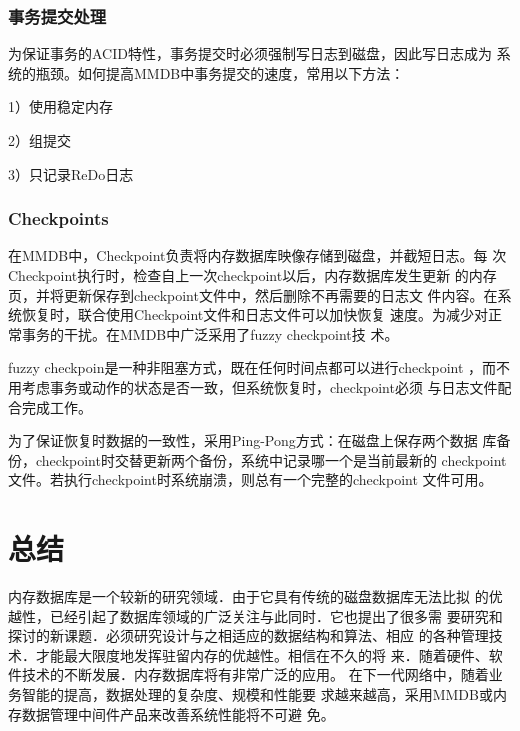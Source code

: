 \documentclass[literaturereview]{zjutreport}
\begin{document}
\subsection{事务提交处理}
为保证事务的ACID特性，事务提交时必须强制写日志到磁盘，因此写日志成为
系统的瓶颈。如何提高MMDB中事务提交的速度，常用以下方法：

1）使用稳定内存

2）组提交

3）只记录ReDo日志

\subsection{Checkpoints}
在MMDB中，Checkpoint负责将内存数据库映像存储到磁盘，并截短日志。每
次Checkpoint执行时，检查自上一次checkpoint以后，内存数据库发生更新
的内存页，并将更新保存到checkpoint文件中，然后删除不再需要的日志文
件内容。在系统恢复时，联合使用Checkpoint文件和日志文件可以加快恢复
速度。为减少对正常事务的干扰。在MMDB中广泛采用了fuzzy checkpoint技
术。

fuzzy checkpoin是一种非阻塞方式，既在任何时间点都可以进行checkpoint
，而不用考虑事务或动作的状态是否一致，但系统恢复时，checkpoint必须
与日志文件配合完成工作。

为了保证恢复时数据的一致性，采用Ping-Pong方式：在磁盘上保存两个数据
库备份，checkpoint时交替更新两个备份，系统中记录哪一个是当前最新的
checkpoint文件。若执行checkpoint时系统崩溃，则总有一个完整的checkpoint
文件可用。

\chapter{总结}
内存数据库是一个较新的研究领域．由于它具有传统的磁盘数据库无法比拟
的优越性，已经引起了数据库领域的广泛关注与此同时．它也提出了很多需
要研究和探讨的新课题．必须研究设计与之相适应的数据结构和算法、相应
的各种管理技术．才能最大限度地发挥驻留内存的优越性。相信在不久的将
来．随着硬件、软件技术的不断发展．内存数据库将有非常广泛的应用。
在下一代网络中，随着业务智能的提高，数据处理的复杂度、规模和性能要
求越来越高，采用MMDB或内存数据管理中间件产品来改善系统性能将不可避
免。

\backmatter
\endgroup %
\clearpage %


\nocite{*}                                   %

\end{document}
